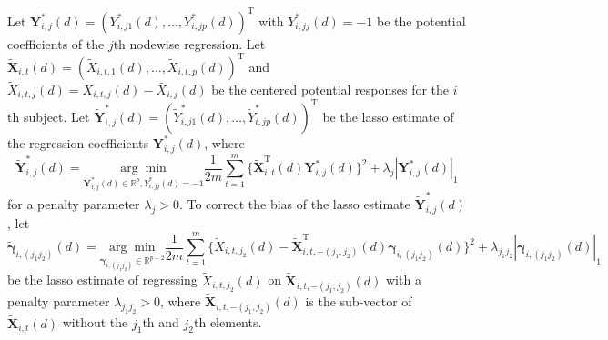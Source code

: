 \documentclass[12pt]{article}
\def\T{{ \mathrm{\scriptscriptstyle T} }}
\theoremstyle{definition}
\newcommand{\E}{\rm E}
\newcommand{\V}{\rm Var}
\newcommand{\bX}{{\mathbf X}}
\newcommand{\bY}{{\mathbf Y}}
\newcommand{\bOmega}{\boldsymbol{\Omega}}
\newcommand{\bSigma}{\boldsymbol{\Sigma}}
\newcommand{\bgamma}{\boldsymbol{\gamma}}
\newcommand{\bmu} {\boldsymbol{\mu}}
\begin{document}

Let $\bY_{i, j}^{\ast}(d) = (Y_{i, j 1}^{\ast}(d), \ldots, Y
_{i, j p}^{\ast}(d))^{\T}$ with $Y_{i, j j}^{\ast}(d) = -1$ be the potential coefficients of the $j$th nodewise regression.
Let $\tilde{\bX}_{i, t}(d) = (\tilde{X}_{i, t, 1}(d), \ldots, \tilde{X}_{i, t, p}(d))^{\T}$ and $\tilde{X}_{i, t, j}(d) = X_{i, t, j}(d) - \bar{X}_{i, j}(d)$ be the centered potential responses for the $i$th subject. Let $\tilde{\bY}_{i, j}^{\ast}(d) = (\tilde{Y}_{i, j 1}^{\ast}(d), \ldots, \tilde{Y}
_{i, j p}^{\ast}(d))^{\T}$ be the lasso estimate of the regression coefficients $\bY_{i, j}^{\ast}(d)$, where
$$\tilde{\bY}_{i, j}^{\ast}(d) = \underset{{\bY}_{i, j}^{\ast}(d) \in \mathbb{R}^{p}, {Y}_{i, j j}^{\ast}(d) = -1}{\arg\min} \frac{1}{2m} \sum_{t = 1}^{m}\{ \tilde{\bX}_{i, t}^{\T}(d) {\bY}_{i, j}^{\ast}(d) \}^{2}  + \lambda_{j} |{\bY}_{i, j}^{\ast}(d)|_1 $$
for a penalty parameter $\lambda_{j} > 0$.
To correct the bias of the lasso estimate $\tilde{\bY}_{i, j}^{\ast}(d)$, let
$$\tilde{\bgamma}_{i, (j_1j_2)}(d) = \underset{\bgamma_{i, (j_1j_2)} \in \mathbb{R}^{p - 2}}{\arg\min} \frac{1}{2m} \sum_{t = 1}^{m} \{\tilde{X}_{i, t, j_2}(d) - \tilde{\bX}_{i, t, -(j_1, j_2)}^{\T}(d) \bgamma_{i, (j_1j_2)}(d) \}^{2} + \lambda_{j_1j_2} | \bgamma_{i, (j_1j_2)}(d)|_{1}$$
be the lasso estimate of regressing $\tilde{X}_{i, t, j_2}(d)$ on $\tilde{\bX}_{i, t, -(j_1, j_2)}(d)$ with a penalty parameter $\lambda_{j_1j_2} > 0$, where $\tilde{\bX}_{i, t, -(j_1, j_2)}(d)$ is the sub-vector of $\tilde{\bX}_{i, t}(d)$ without the $j_1$th and $j_2$th elements.
\end{document}
